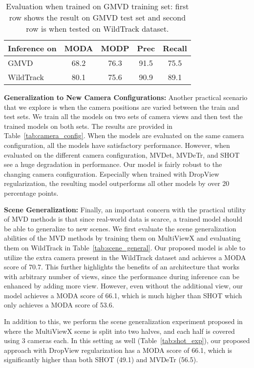 \documentclass[letterpaper, 10 pt, conference]{ieeeconf}  \usepackage{times}
\newcommand{\wildtrack}{WildTrack }
\begin{document}
\begin{table}[t]
\centering
\caption{Evaluation when trained on GMVD training set: first row shows the result on GMVD test set and second row is when tested on \wildtrack dataset. }
\small
\begin{tabular}{@{}lcccc@{}}
\toprule
Inference on & MODA & MODP & Prec & Recall \\ \midrule
GMVD & 68.2 & 76.3 & 91.5  & 75.5   \\
WildTrack & 80.1 & 75.6 & 90.9  & 89.1      \\ \bottomrule
\end{tabular}

\label{tab:gmvd_dataset_exp}
\end{table}
\textbf{Generalization to New Camera Configurations:} Another practical scenario that we explore is when the camera positions are varied between the train and test sets. We train all the models on two sets of camera views and then test the trained models on both sets. The results are provided in Table~\ref{tab:camera_config}. When the models are evaluated on the same camera configuration, all the models have satisfactory performance. However, when evaluated on the different camera configuration, MVDet, MVDeTr, and SHOT see a huge degradation in performance. Our model is fairly robust to the changing camera configuration. Especially when trained with DropView regularization, the resulting model outperforms all other models by over 20 percentage points.



\textbf{Scene Generalization:} Finally, an important concern with the practical utility of MVD methods is that since real-world data is scarce, a trained model should be able to generalize to new scenes. We first evaluate the scene generalization abilities of the MVD methods by training them on MultiViewX and evaluating them on WildTrack in Table~\ref{tab:scene_general}. Our proposed model is able to utilize the extra camera present in the WildTrack dataset and achieves a MODA score of 70.7. This further highlights the benefits of an architecture that works with arbitrary number of views, since the performance during inference can be enhanced by adding more view. However, even without the additional view, our model achieves a MODA score of 66.1, which is much higher than SHOT which only achieves a MODA score of 53.6. 

In addition to this, we perform the scene generalization experiment proposed in \cite{song2021stacked} where the MultiViewX scene is split into two halves, and each half is covered using 3 cameras each. In this setting as well (Table~\ref{tab:shot_exp}), our proposed approach with DropView regularization has a MODA score of 66.1, which is significantly higher than both SHOT (49.1) and MVDeTr (56.5).
\end{document}
